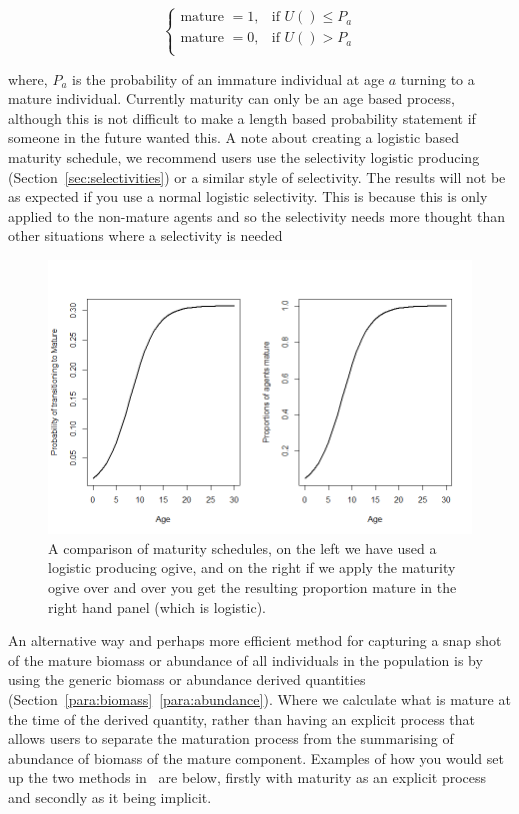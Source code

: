 \begin{equation}
	\begin{cases}
	\text{mature } = 1, & \text{if } U() \leq P_a\\
	\text{mature } = 0, & \text{if } U() > P_a\\
	\end{cases}
\end{equation}

where, $P_a$ is the probability of an immature individual at age $a$ turning to a mature individual. Currently maturity can only be an age based process, although this is not difficult to make a length based probability statement if someone in the future wanted this. A note about creating a logistic based maturity schedule, we recommend users use the selectivity logistic producing (Section~\ref{sec:selectivities}) or a similar style of selectivity. The results will not be as expected if you use a normal logistic selectivity. This is because this is only applied to the non-mature agents and so the selectivity needs more thought than other situations where a selectivity is needed\\

\begin{figure}[htp]\label{fig:mature}
	\centering
	\includegraphics[scale=0.6]{Figures/maturity_ogives.png}%
	\caption{A comparison of maturity schedules, on the left we have used a logistic producing ogive, and on the right if we apply the maturity ogive over and over you get the resulting proportion mature in the right hand panel (which is logistic).}
\end{figure}


An alternative way and perhaps more efficient method for capturing a snap shot of the mature biomass or abundance of all individuals in the population is by using the generic biomass or abundance derived quantities (Section~\ref{para:biomass}~\ref{para:abundance}). Where we calculate what is mature at the time of the derived quantity, rather than having an explicit process that allows users to separate the maturation process from the summarising of abundance of biomass of the mature component. Examples of how you would set up the two methods in \IBM\ are below, firstly with maturity as an explicit process and secondly as it being implicit.

